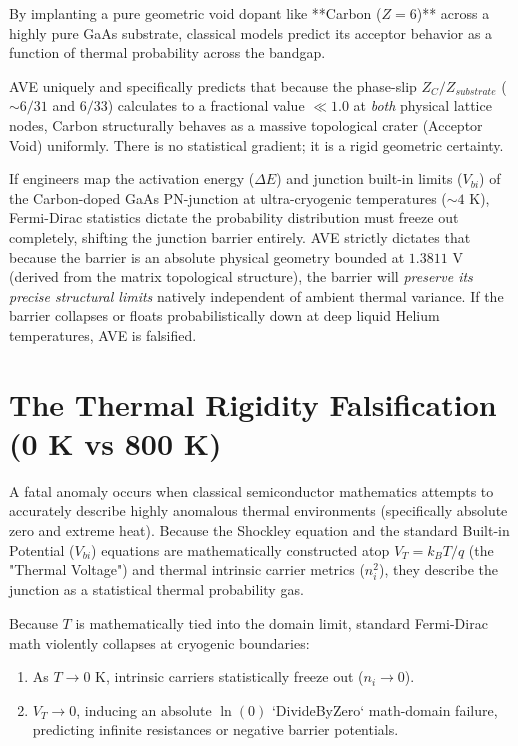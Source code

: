 By implanting a pure geometric void dopant like **Carbon ($Z=6$)** across a highly pure GaAs substrate, classical models predict its acceptor behavior as a function of thermal probability across the bandgap. 

AVE uniquely and specifically predicts that because the phase-slip $Z_C / Z_{substrate}$ ($\sim 6 / 31$ and $6 / 33$) calculates to a fractional value $\ll 1.0$ at \textit{both} physical lattice nodes, Carbon structurally behaves as a massive topological crater (Acceptor Void) uniformly. There is no statistical gradient; it is a rigid geometric certainty. 

If engineers map the activation energy ($\Delta E$) and junction built-in limits ($V_{bi}$) of the Carbon-doped GaAs PN-junction at ultra-cryogenic temperatures ($\sim 4\text{ K}$), Fermi-Dirac statistics dictate the probability distribution must freeze out completely, shifting the junction barrier entirely. AVE strictly dictates that because the barrier is an absolute physical geometry bounded at $1.3811\text{ V}$ (derived from the matrix topological structure), the barrier will \textit{preserve its precise structural limits} natively independent of ambient thermal variance. If the barrier collapses or floats probabilistically down at deep liquid Helium temperatures, AVE is falsified.

\section{The Thermal Rigidity Falsification (0 K vs 800 K)}
\label{sec:thermal_rigidity_falsification}

A fatal anomaly occurs when classical semiconductor mathematics attempts to accurately describe highly anomalous thermal environments (specifically absolute zero and extreme heat). Because the Shockley equation and the standard Built-in Potential ($V_{bi}$) equations are mathematically constructed atop $V_T = k_B T / q$ (the "Thermal Voltage") and thermal intrinsic carrier metrics ($n_i^2$), they describe the junction as a statistical thermal probability gas.

Because $T$ is mathematically tied into the domain limit, standard Fermi-Dirac math violently collapses at cryogenic boundaries:
\begin{enumerate}
    \item As $T \to 0$ K, intrinsic carriers statistically freeze out ($n_i \to 0$).
    \item $V_T \to 0$, inducing an absolute $\ln(0)$ `DivideByZero` math-domain failure, predicting infinite resistances or negative barrier potentials.
\end{enumerate}

